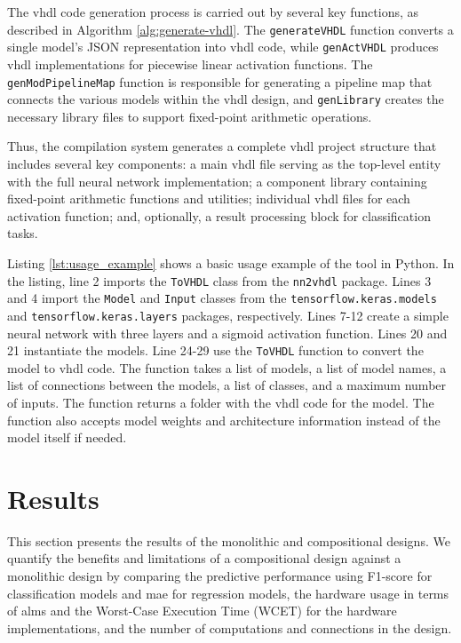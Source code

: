     
    
The \gls{vhdl} code generation process is carried out by several key functions, as described in Algorithm \ref{alg:generate-vhdl}. The \texttt{generateVHDL} function converts a single model's JSON representation into \gls{vhdl} code, while \texttt{genActVHDL} produces \gls{vhdl} implementations for piecewise linear activation functions. The \texttt{genModPipelineMap} function is responsible for generating a pipeline map that connects the various models within the \gls{vhdl} design, and \texttt{genLibrary} creates the necessary library files to support fixed-point arithmetic operations.

Thus, the compilation system generates a complete \gls{vhdl} project structure that includes several key components: a main \gls{vhdl} file serving as the top-level entity with the full neural network implementation; a component library containing fixed-point arithmetic functions and utilities; individual \gls{vhdl} files for each activation function; and, optionally, a result processing block for classification tasks. 

Listing \ref{lst:usage_example} shows a basic usage example of the tool in Python. In the listing, line 2 imports the \texttt{ToVHDL} class from the \texttt{nn2vhdl} package. Lines 3 and 4 import the \texttt{Model} and \texttt{Input} classes from the \texttt{tensorflow.keras.models} and \texttt{tensorflow.keras.layers} packages, respectively. Lines 7-12 create a simple neural network with three layers and a sigmoid activation function. Lines 20 and 21 instantiate the models. Line 24-29 use the \texttt{ToVHDL} function to convert the model to \gls{vhdl} code. The function takes a list of models, a list of model names, a list of connections between the models, a list of classes, and a maximum number of inputs. The function returns a folder with the \gls{vhdl} code for the model. The function also accepts model weights and architecture information instead of the model itself if needed.
 




\section{Results}
\label{sec:sub_results}



This section presents the results of the monolithic and compositional designs. We quantify the benefits and limitations of a compositional design against a monolithic design by comparing the predictive performance using F1-score for classification models and \gls{mae} for regression models, the hardware usage in terms of \glspl{alm} and the Worst-Case Execution Time (WCET) for the hardware implementations, and the number of computations and connections in the design. 

